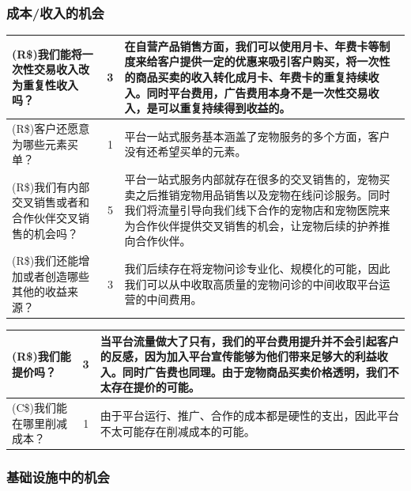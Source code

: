 \documentclass[a4paper]{ctexart}
\begin{document}
\subsubsection{成本/收入的机会}
\begin{table}[h]
  \centering
\begin{tabular}{|p{3.5cm}|c|p{10cm}|}
  \hline
  (R\$)我们能将一次性交易收入改为重复性收入吗？ & 3 & 在自营产品销售方面，我们可以使用月卡、年费卡等制度来给客户提供一定的优惠来吸引客户购买，将一次性的商品买卖的收入转化成月卡、年费卡的重复持续收入。同时平台费用，广告费用本身不是一次性交易收入，是可以重复持续得到收益的。\\
  \hline
  (R\$)客户还愿意为哪些元素买单？ & 1 & 平台一站式服务基本涵盖了宠物服务的多个方面，客户没有还希望买单的元素。\\
  \hline
  (R\$)我们有内部交叉销售或者和合作伙伴交叉销售的机会吗？ & 5 & 平台一站式服务内部就存在很多的交叉销售的，宠物买卖之后推销宠物用品销售以及宠物在线问诊服务。同时我们将流量引导向我们线下合作的宠物店和宠物医院来为合作伙伴提供交叉销售的机会，让宠物后续的护养推向合作伙伴。\\
  \hline
  (R\$)我们还能增加或者创造哪些其他的收益来源？ & 3 & 我们后续存在将宠物问诊专业化、规模化的可能，因此我们可以从中收取高质量的宠物问诊的中间收取平台运营的中间费用。\\
  \hline
\end{tabular}
\end{table}
\begin{table}[h]
  \centering
\begin{tabular}{|p{3.5cm}|c|p{10cm}|}
  \hline
  (R\$)我们能提价吗？ & 3 & 当平台流量做大了只有，我们的平台费用提升并不会引起客户的反感，因为加入平台宣传能够为他们带来足够大的利益收入。同时广告费也同理。由于宠物商品买卖价格透明，我们不太存在提价的可能。\\
  \hline
  (C\$)我们能在哪里削减成本？ & 1 & 由于平台运行、推广、合作的成本都是硬性的支出，因此平台不太可能存在削减成本的可能。\\
  \hline
\end{tabular}
\end{table}

\FloatBarrier
\subsubsection{基础设施中的机会}
\end{document}
